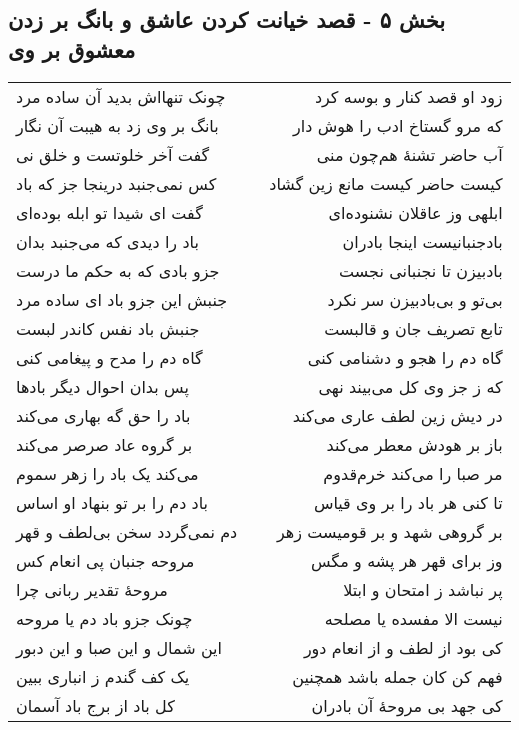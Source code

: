 \begin{center}
\section*{بخش ۵ - قصد خیانت کردن عاشق و بانگ  بر زدن معشوق بر وی}
\label{sec:sh005}
\begin{longtable}{l p{0.5cm} r}
چونک تنهااش بدید آن ساده مرد
&&
زود او قصد کنار و بوسه کرد
\\
بانگ بر وی زد به هیبت آن نگار
&&
که مرو گستاخ ادب را هوش دار
\\
گفت آخر خلوتست و خلق نی
&&
آب حاضر تشنهٔ هم‌چون منی
\\
کس نمی‌جنبد درینجا جز که باد
&&
کیست حاضر کیست مانع زین گشاد
\\
گفت ای شیدا تو ابله بوده‌ای
&&
ابلهی وز عاقلان نشنوده‌ای
\\
باد را دیدی که می‌جنبد بدان
&&
بادجنبانیست اینجا بادران
\\
جزو بادی که به حکم ما درست
&&
بادبیزن تا نجنبانی نجست
\\
جنبش این جزو باد ای ساده مرد
&&
بی‌تو و بی‌بادبیزن سر نکرد
\\
جنبش باد نفس کاندر لبست
&&
تابع تصریف جان و قالبست
\\
گاه دم را مدح و پیغامی کنی
&&
گاه دم را هجو و دشنامی کنی
\\
پس بدان احوال دیگر بادها
&&
که ز جز وی کل می‌بیند نهی
\\
باد را حق گه بهاری می‌کند
&&
در دیش زین لطف عاری می‌کند
\\
بر گروه عاد صرصر می‌کند
&&
باز بر هودش معطر می‌کند
\\
می‌کند یک باد را زهر سموم
&&
مر صبا را می‌کند خرم‌قدوم
\\
باد دم را بر تو بنهاد او اساس
&&
تا کنی هر باد را بر وی قیاس
\\
دم نمی‌گردد سخن بی‌لطف و قهر
&&
بر گروهی شهد و بر قومیست زهر
\\
مروحه جنبان پی انعام کس
&&
وز برای قهر هر پشه و مگس
\\
مروحهٔ تقدیر ربانی چرا
&&
پر نباشد ز امتحان و ابتلا
\\
چونک جزو باد دم یا مروحه
&&
نیست الا مفسده یا مصلحه
\\
این شمال و این صبا و این دبور
&&
کی بود از لطف و از انعام دور
\\
یک کف گندم ز انباری ببین
&&
فهم کن کان جمله باشد همچنین
\\
کل باد از برج باد آسمان
&&
کی جهد بی مروحهٔ آن بادران
\\

\end{longtable}
\end{center}
